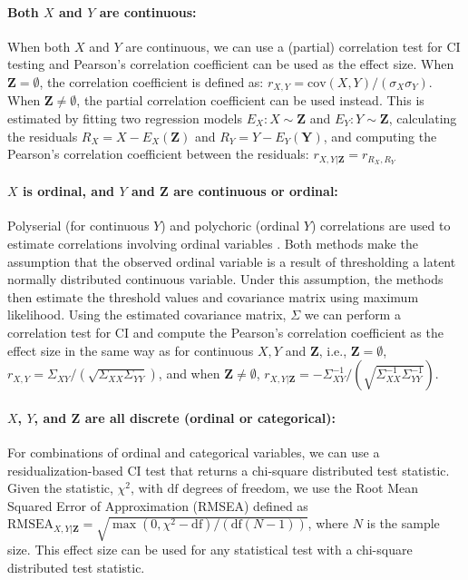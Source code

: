 \documentclass{uai2025} %
\begin{document}
\paragraph{Both $ X $ and $ Y $ are continuous: }
When both $ X $ and $ Y $ are continuous, we can use a (partial) correlation
test for CI testing and Pearson's correlation coefficient can be used as the
effect size. When $ \bm{Z} = \emptyset $, the correlation coefficient is
defined as: $ r_{X, Y} = \mathrm{cov}(X, Y) / (\sigma_X \sigma_Y) $. When $
\bm{Z} \neq \emptyset $, the partial correlation coefficient can be used instead.
This is estimated by fitting two regression models $ E_X: X \sim \bm{Z} $ and $ E_Y: Y
\sim \bm{Z} $, calculating the residuals $ R_X = X - E_X(\bm{Z}) $ and $ R_Y =
Y - E_Y(\bm{Y}) $, and computing the Pearson's correlation coefficient between the
residuals: $r_{X, Y \rvert \bm{Z}} = r_{R_X, R_Y}$

\paragraph{$ X $ is ordinal, and $ Y $ and $ \bm{Z} $  are continuous or ordinal: }

Polyserial (for continuous $Y$) and polychoric
(ordinal $Y$) correlations are used to estimate correlations 
involving ordinal variables \citep{Poon1987}. Both methods make the assumption that the
observed ordinal variable is a result of thresholding a latent normally
distributed continuous variable. Under this assumption, the methods then 
estimate the threshold values and covariance matrix using maximum likelihood.
Using the estimated covariance matrix, $ \Sigma $ we can perform a correlation
test for CI and compute the Pearson's correlation coefficient as the effect
size in the same way as for continuous $ X, Y $ and $ \bm{Z} $, i.e., 
$\bm{Z} = \emptyset $, $ r_{X, Y} = \Sigma_{XY} / (\sqrt{\Sigma_{XX} \Sigma_{YY}}) $, 
	and when $ \bm{Z} \ne \emptyset $,
	$ r_{X, Y \rvert \bm{Z}} = - \Sigma^{-1}_{XY}/ (\sqrt{\Sigma^{-1}_{XX} \Sigma^{-1}_{YY}}) $.

\paragraph{$ X $, $ Y $, and $ \bm{Z} $ are all discrete (ordinal or categorical): }

For combinations of ordinal and categorical variables, we
can use a residualization-based CI test \citep{Ankan2023} that returns a 
chi-square distributed test statistic. Given the statistic, $ \chi^2 $, with $ \textrm{df} $ degrees of
freedom, we use the Root Mean Squared Error of Approximation (RMSEA) defined as
 $ \textrm{RMSEA}_{X, Y \rvert \bm{Z}} =
\sqrt{\max(0,\chi^2 - \textrm{df})/ (\textrm{df} (N-1))} $, where $ N $ is the sample
size. This effect size can be used for any statistical test with a chi-square 
distributed test statistic. 
\end{document}
